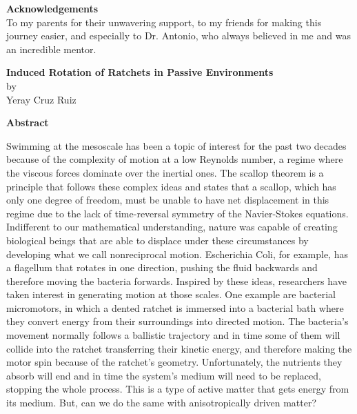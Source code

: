 \newpage %
\Huge {\bf Acknowledgements} \\
\vfill
\normalsize To my parents for their unwavering support, to my friends for making this journey easier, and especially to Dr. Antonio, who always believed in me and was an incredible mentor. 
\vfill

\vspace{5em}

\newpage %
\begin{center}
  \large {{\bf Induced Rotation of Ratchets in Passive Environments}\\
  by\\
Yeray Cruz Ruiz}
\end{center}
\Huge{{\bf Abstract}} \\
\normalsize
\vspace*{0em}

Swimming at the mesoscale has been a topic of interest for the past two decades because of the complexity of motion at a low Reynolds number, a regime where the viscous forces dominate over the inertial ones. The scallop theorem is a principle that follows these complex ideas and states that a scallop, which has only one degree of freedom, must be unable to have net displacement in this regime due to the lack of time-reversal symmetry of the Navier-Stokes equations. Indifferent to our mathematical understanding, nature was capable of creating biological beings that are able to displace under these circumstances by developing what we call nonreciprocal motion. Escherichia Coli, for example, has a flagellum that rotates in one direction, pushing the fluid backwards and therefore moving the bacteria forwards. Inspired by these ideas, researchers have taken interest in generating motion at those scales. One example are bacterial micromotors, in which a dented ratchet is immersed into a bacterial bath where they convert energy from their surroundings into directed motion. The bacteria's movement normally follows a ballistic trajectory and in time some of them will collide into the ratchet transferring their kinetic energy, and therefore making the motor spin because of the ratchet's geometry. Unfortunately, the nutrients they absorb will end and in time the system's medium will need to be replaced, stopping the whole process. This is a type of active matter that gets energy from its medium. But, can we do the same with anisotropically driven matter?

